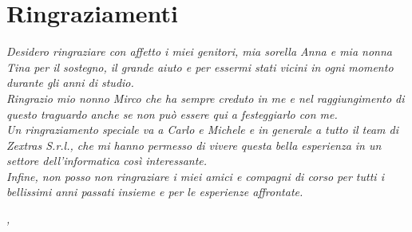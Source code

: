 \cleardoublepage
{}
\thispagestyle{empty}


\begingroup
\let\clearpage\relax
\let\cleardoublepage\relax
\let\cleardoublepage\relax

\chapter*{Ringraziamenti}


\noindent \textit{Desidero ringraziare con affetto i miei genitori, mia sorella Anna e mia nonna Tina per il sostegno, il grande aiuto e per essermi stati vicini in ogni momento durante gli anni di studio.}\\

\noindent \textit{Ringrazio mio nonno Mirco che ha sempre creduto in me e nel raggiungimento di questo traguardo anche se non può essere qui a festeggiarlo con me.}\\

\noindent \textit{Un ringraziamento speciale va a Carlo e Michele e in generale a tutto il team di Zextras S.r.l., che mi hanno permesso di vivere questa bella esperienza in un settore dell’informatica così interessante.}\\

\noindent \textit{Infine, non posso non ringraziare i miei amici e compagni di corso per tutti i bellissimi anni passati insieme e per le esperienze affrontate.}
\bigskip
\bigskip

\noindent\textit{\myLocation, \myTime}
\hfill \myName

\endgroup
